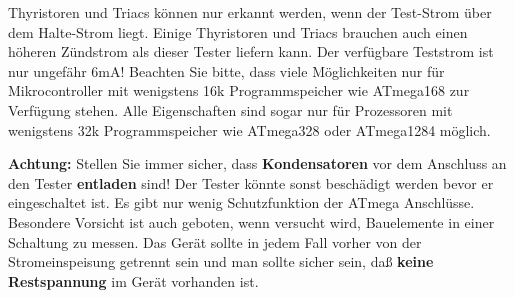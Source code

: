 Thyristoren und Triacs können nur erkannt werden, wenn der Test-Strom über dem Halte-Strom liegt.
Einige Thyristoren und Triacs brauchen auch einen höheren Zündstrom als dieser Tester liefern kann.
Der verfügbare Teststrom ist nur ungefähr 6mA!
Beachten Sie bitte, dass viele Möglichkeiten nur für Mikrocontroller mit wenigstens 16k Programmspeicher wie ATmega168 zur Verfügung stehen. 
Alle Eigenschaften sind sogar nur für Prozessoren mit wenigstens 32k Programmspeicher wie ATmega328 oder ATmega1284 möglich.

\vspace{1cm}
\textbf{{\Large Achtung:}} Stellen Sie immer sicher, dass {\bf Kondensatoren} vor dem Anschluss an den Tester {\bf entladen} sind!
Der Tester könnte sonst beschädigt werden bevor er eingeschaltet ist.
Es gibt nur wenig Schutzfunktion der ATmega Anschlüsse.
Besondere Vorsicht ist auch geboten, wenn versucht wird, Bauelemente in einer Schaltung zu messen.
Das Gerät sollte in jedem Fall vorher von der Strom\-ein\-spei\-sung getrennt sein und man sollte sicher sein,
daß {\bf keine Restspannung} im Gerät vorhanden ist.


